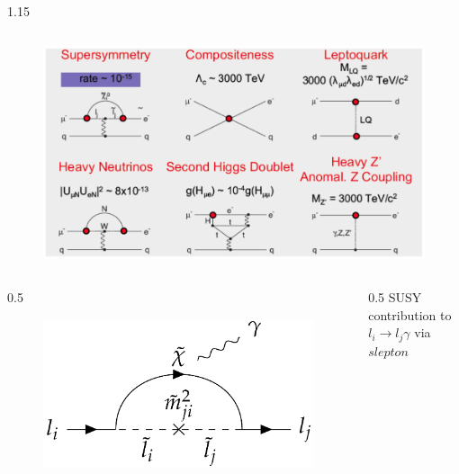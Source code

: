\documentclass{beamer}
\begin{document}
\begin{frame}
\begin{columns}
\begin{column}{1.15\framewidth}
\begin{itemize}
\begin{itemize}
    \end{itemize}


\end{itemize}
\end{column}
\end{columns}
\end{frame}


\begin{frame}
    \begin{figure}[h]
        \centering
        \includegraphics[width=1.\textwidth]{figures/png/Screenshot_20240927_131322.png}
    \end{figure} 
    \begin{columns}
        \begin{column}{0.5\framewidth}
    \begin{figure}[!h]
        \centering
        \includegraphics[width =0.55\columnwidth]{figures/png/Screenshot_20240218_105920.png}
        \label{fig:susy}
        \end{figure}
    \end{column}
    \begin{column}{0.5\framewidth}
   {\small SUSY contribution to $l_i \rightarrow l_j\gamma$ via $slepton$ }
    \end{column}
\end{columns}
\end{frame}
\end{document}
